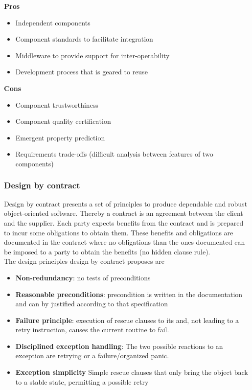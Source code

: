 \begin{minipage}[t]{0.49\textwidth}
    \textbf{Pros}
    \begin{itemize}[topsep=0pt, itemsep=0pt]
        \item Independent components
        \item Component standards to facilitate integration
        \item Middleware to provide support for inter-operability
        \item Development process that is geared to reuse
    \end{itemize}
\end{minipage}
\begin{minipage}[t]{0.49\textwidth}
    \textbf{Cons}
    \begin{itemize}[topsep=0pt, itemsep=0pt]
        \item Component trustworthiness
        \item Component quality certification
        \item Emergent property prediction
        \item Requirements trade-offs (difficult analysis between features of two components)
    \end{itemize}
\end{minipage}

\subsubsection{Design by contract}
Design by contract presents a set of principles to produce dependable and robust object-oriented software.
Thereby a contract is an agreement between the client and the supplier.
Each party expects benefits from the contract and is prepared to incur some obligations to obtain them.
These benefits and obligations are documented in the contract where no obligations than the ones documented can be imposed to a party to obtain the benefits (no hidden clause rule).\\
The design principles design by contract proposes are
\begin{itemize}
  \item \textbf{Non-redundancy}: no tests of preconditions
  \item \textbf{Reasonable preconditions}: precondition is written in the documentation and can by justified according to that specification
  \item \textbf{Failure principle}: execution of rescue clauses to its and, not leading to a retry instruction, causes the current routine to fail.
  \item \textbf{Disciplined exception handling}: The two possible reactions to an exception are retrying or a failure/organized panic.
  \item \textbf{Exception simplicity} Simple rescue clauses that only bring the object back to a stable state, permitting a possible retry
\end{itemize}
